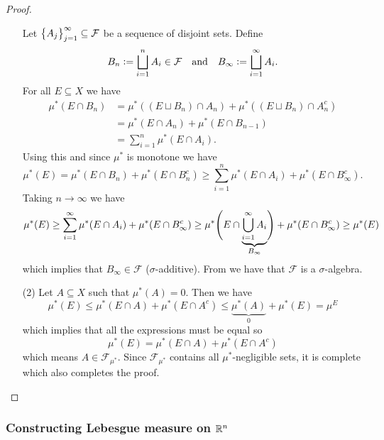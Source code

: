 \documentclass[11pt,a4paper]{article}
\begin{document}
\begin{proof}
\begin{enumerate}
  Let $\set{A_j}_{j=1}^{\infty} \subseteq \mathcal F$ be a sequence of
  disjoint sets.
  Define
  \[
    B_n := \bigsqcup_{i=1}^{n} A_i \in \mathcal F
    \tand
    B_{\infty} := \bigsqcup_{i=1}^{\infty} A_i.
  \]
  For all $E \subseteq X$ we have
  \begin{align*}
    \mu^*(E \cap B_n) &= 
    \mu^*((E \sqcup B_n) \cap A_n) +
    \mu^*((E \sqcup B_n) \cap A_n^c) \\ &=
    \mu^*(E \cap A_n) + \mu^*(E \cap B_{n-1}) \\ &=
    \sum_{i=1}^{n} \mu^*(E \cap A_i).
  \end{align*}
  Using this and since $\mu^*$ is monotone we have
  \[
    \mu^*(E) =
    \mu^*(E \cap B_n) + \mu^*(E \cap B_n^c) \geq
    \sum_{i=1}^{n} \mu^*(E \cap A_i) + \mu^*(E \cap B_{\infty}^c).
  \]
  Taking $n \to \infty$ we have
  \[
    \mu^*(E) \geq
    \sum_{i=1}^{\infty} \mu^*(E \cap A_i) + \mu^*(E \cap B_{\infty}^c) \geq
    \mu^*\del[4]{E \cap \underbrace{\bigcup_{i=1}^{\infty} A_i}_{B_{\infty}}}   
    + \mu^*(E \cap B_{\infty}^c) \geq
    \mu^*(E)
  \]
  which implies that $B_{\infty} \in \mathcal F$ ($\sigma$-additive).
  From  we have that $\mathcal F$ is a $\sigma$-algebra.
  \item[(2)] Let $A \subseteq X$ such that $\mu^*(A) = 0$.
  Then we have
  \[
    \mu^*(E) \le
    \mu^*(E \cap A) + \mu^*(E \cap A^c) \le
    \underbrace{\mu^*(A)}_{0} + \mu^*(E) =
    \mu^{E}
  \]
  which implies that all the expressions must be equal so
  \[
    \mu^*(E) =
    \mu^*(E \cap A) + \mu^*(E \cap A^c)
  \]
  which means $A \in \mathcal F_{\mu^*}$.
  Since $\mathcal F_{\mu^*}$ contains all $\mu^*$-negligible sets, it is
  complete which also completes the proof.
\end{enumerate}
\end{proof}

\subsubsection{Constructing Lebesgue measure on \texorpdfstring{$\mathbb{R}^n$}{Rn}}
\end{document}
